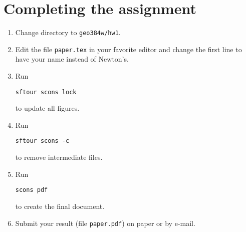 \lstset{language=python,numbers=left,numberstyle=\tiny,showstringspaces=false}


\section{Completing the assignment}

\begin{enumerate}
\item Change directory to \verb#geo384w/hw1#.
\item Edit the file \texttt{paper.tex} in your favorite editor and change the
first line to have your name instead of Newton's.
\item Run
\begin{verbatim}
sftour scons lock
\end{verbatim}
to update all figures.
\item Run
\begin{verbatim}
sftour scons -c
\end{verbatim}
  to remove intermediate files.
\item Run
\begin{verbatim} 
scons pdf
\end{verbatim}
to create the final document.
\item Submit your result (file \texttt{paper.pdf}) on paper or by
e-mail.
\end{enumerate}
